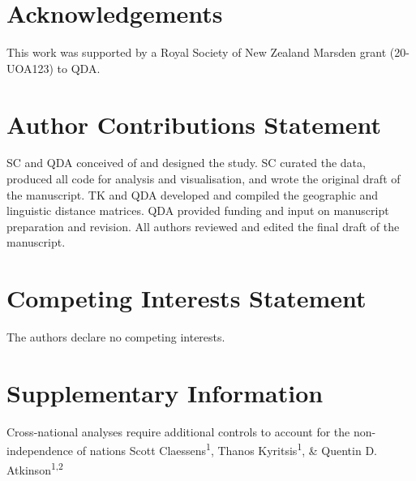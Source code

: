 \documentclass[
  man,floatsintext]{apa6}
\begin{document}
\endgroup

\newpage

\hypertarget{acknowledgements}{%
\section{Acknowledgements}\label{acknowledgements}}

This work was supported by a Royal Society of New Zealand Marsden grant (20-UOA123) to QDA.

\hypertarget{author-contributions-statement}{%
\section{Author Contributions Statement}\label{author-contributions-statement}}

SC and QDA conceived of and designed the study. SC curated the data, produced all code for analysis and visualisation, and wrote the original draft of the manuscript. TK and QDA developed and compiled the geographic and linguistic distance matrices. QDA provided funding and input on manuscript preparation and revision. All authors reviewed and edited the final draft of the manuscript.

\hypertarget{competing-interests-statement}{%
\section{Competing Interests Statement}\label{competing-interests-statement}}

The authors declare no competing interests.

\newpage
\vspace*{60mm}

\renewcommand{\figurename}{Supplementary Figure}
\renewcommand{\tablename}{Supplementary Table}
\renewcommand{\thefigure}{\arabic{figure}} \setcounter{figure}{0}
\renewcommand{\thetable}{\arabic{table}} \setcounter{table}{0}
\renewcommand{\theequation}{S\arabic{equation}} \setcounter{equation}{0}

\hypertarget{supplementary-information}{%
\section{\texorpdfstring{\textbf{Supplementary Information}}{Supplementary Information}}\label{supplementary-information}}

\setcounter{page}{1}
\centering

\noindent \small Cross-national analyses require additional controls to account for the non-independence of nations \newline
\hspace*{1cm} \small Scott Claessens\textsuperscript{1}, Thanos Kyritsis\textsuperscript{1}, \& Quentin D. Atkinson\textsuperscript{1,2} \newline
\end{document}
